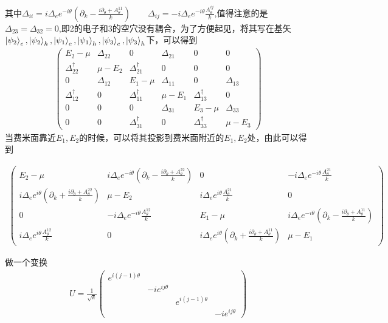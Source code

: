 \documentclass[22pt]{article}
\begin{document}
	其中$\Delta_{ii}=i\Delta_ee^{-i\theta}(\partial_k-\frac{i\partial_{\theta}+A_{\theta}^{11}}{k})\qquad \Delta_{ij}=-i\Delta_ee^{-i\theta}\frac{A_{\theta}^{ij}}{k}$,值得注意的是$\Delta_{23}=\Delta_{32}=0$,即2的电子和3的空穴没有耦合，为了方便起见，将其写在基矢$\ket{\psi_2}_e,\ket{\psi_2}_h,\ket{\psi_1}_e,\ket{\psi_1}_h,\ket{\psi_3}_e,\ket{\psi_3}_h$下，可以得到
	\begin{align}
		\begin{pmatrix}
			E_2-\mu &\Delta_{22} &0&\Delta_{21}&0&0\\
			\Delta_{22}^{\dagger}&\mu-E_2 &\Delta_{21}^{\dagger}&0&0&0\\
			0&\Delta_{12}&E_1-\mu&\Delta_{11}&0&\Delta_{13}\\
			\Delta_{12}^{\dagger}&0&\Delta_{11}^{\dagger}&\mu-E_1&\Delta_{13}^{\dagger}&0\\
			0&0&0&\Delta_{31}&E_3-\mu&\Delta_{33}\\
			0&0&\Delta_{31}^{\dagger}&0&\Delta_{33}^{\dagger}&\mu-E_3
		\end{pmatrix}
	\end{align}
当费米面靠近$E_1,E_2$的时候，可以将其投影到费米面附近的$E_1,E_2$处，由此可以得到
\begin{normalsize}
\begin{align}
	\begin{pmatrix}
		E_2-\mu&i\Delta_ee^{-i\theta}(\partial_k-\frac{i\partial_{\theta}+A_{\theta}^{22}}{k})&0&-i\Delta_ee^{-i\theta}\frac{A_{\theta}^{21}}{k}\\
		i\Delta_ee^{i\theta}(\partial_k+\frac{i\partial_{\theta}+A_{\theta}^{22}}{k})&\mu-E_2&i\Delta_ee^{i\theta}\frac{A_{\theta}^{21}}{k}&0\\
		0&-i\Delta_ee^{-i\theta}\frac{A_{\theta}^{12}}{k}&E_1-\mu&i\Delta_ee^{-i\theta}(\partial_k-\frac{i\partial_{\theta}+A_{\theta}^{11}}{k})\\
		i\Delta_ee^{i\theta}\frac{A_{\theta}^{12}}{k}&0&i\Delta_ee^{i\theta}(\partial_k+\frac{i\partial_{\theta}+A_{\theta}^{11}}{k})&\mu-E_1
	\end{pmatrix}
\end{align}	
\end{normalsize}	
	做一个变换
	\begin{align}
		U=\frac{1}{\sqrt{k}}
		\begin{pmatrix}
			e^{i(j-1)\theta}&&&\\
			&-ie^{ij\theta}&&\\
			&&e^{i(j-1)\theta}&\\
			&&&-ie^{ij\theta}
		\end{pmatrix}
	\end{align}
\end{document}
